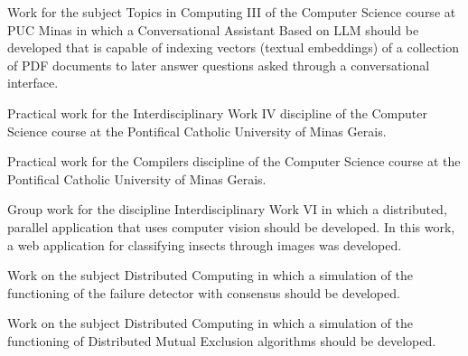 
Work for the subject Topics in Computing III of the Computer Science course at PUC Minas in which a Conversational Assistant Based on LLM should be developed that is capable of indexing vectors (textual embeddings) of a collection of PDF documents to later answer questions asked through a conversational interface.\\
\divider

Practical work for the Interdisciplinary Work IV discipline of the Computer Science course at the Pontifical Catholic University of Minas Gerais.\\
\divider

Practical work for the Compilers discipline of the Computer Science course at the Pontifical Catholic University of Minas Gerais.\\
\divider

Group work for the discipline Interdisciplinary Work VI in which a distributed, parallel application that uses computer vision should be developed. In this work, a web application for classifying insects through images was developed.\\
\divider

Work on the subject Distributed Computing in which a simulation of the functioning of the failure detector with consensus should be developed.\\
\divider

Work on the subject Distributed Computing in which a simulation of the functioning of Distributed Mutual Exclusion algorithms should be developed.\\
\divider

